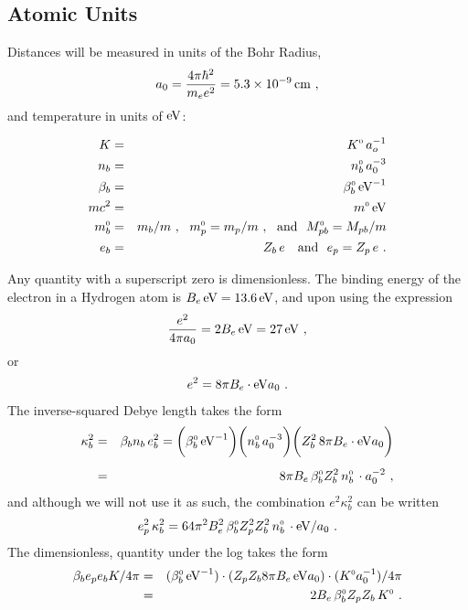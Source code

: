 \documentclass[preprint,12pt,eqsecnum,nofootinbib,amsmath,amssymb]{revtex4}
\newcommand{\smO}{{\rm\scriptscriptstyle 0}}
\begin{document}
\subsection{Atomic Units}

Distances will be measured in units of the Bohr Radius,
\begin{eqnarray}
\label{bohrradiusdef}
  a_0 = \frac{4\pi \hbar^2}{m_e e^2}
  = 5.3 \times 10^{-9}\,{\rm cm} \ ,
\end{eqnarray}
and temperature in units of ${\rm eV}$:
\begin{mathletters}
\label{azeroquantities}  
\begin{eqnarray}
  K &=& K^\smO\, a_o^{-1}
\\
  n_b &=& n_b^\smO\, a_0^{-3} 
\\
  \beta_b &=& \beta_b^\smO\, {\rm eV}^{-1}
\\
  m c^2 &=& m^\smO \, {\rm eV}
\\
  m_b^\smO &=& m_b/m \ , ~~ m_p^\smO = m_p/m \ ,
  ~~{\rm and} ~~ M_{pb}^\smO = M_{pb}/m
\\
  e_b &=& Z_b\, e ~~~{\rm and}~~
  e_p  = Z_p\, e \ .
\end{eqnarray}
\end{mathletters}
Any quantity with a superscript zero is
dimensionless. The binding energy of the 
electron in a Hydrogen atom is $B_e \,
{\rm eV} = 13.6\,{\rm eV}$, and upon 
using the expression
\begin{eqnarray}
\label{eazeroone}
  \frac{e^2}{4\pi a_0} = 2B_e\,{\rm eV} 
  = 27\,{\rm eV} \ ,
\end{eqnarray}
or
\begin{eqnarray}
\label{eazerotwo} 
  e^2 = 8\pi B_e \cdot {\rm eV} a_0 \ .
\end{eqnarray}
The inverse-squared Debye length takes the form
\begin{eqnarray}
\nonumber
  \kappa_b^2 
  &=& \beta_b n_b\, e_b^2
  = 
  \bigg(\beta_b^\smO\,{\rm eV}^{-1}\bigg)
  \bigg(n_b^\smO\, a_0^{-3}\bigg)
  \bigg(Z_b^2\, 8 \pi B_e\cdot {\rm eV} a_0 \bigg)
\\[5pt]
  &=&
  8 \pi B_e \,
  \beta_b^\smO Z_b^2\,n_b^\smO \,\cdot a_0^{-2} \ ,
\end{eqnarray}
and although we will not use it as such, the combination 
$e^2 \kappa_b^2$ can be written
\begin{eqnarray}
  e_p^2\, \kappa_b^2 
  = 
  64 \pi^2 B_e^2 \,
  \beta_b^\smO Z_p^2 Z_b^2\,n_b^\smO \,\cdot {\rm eV}/a_0 \ .
\end{eqnarray}
The dimensionless, quantity under the log takes the form
\begin{eqnarray}
  \beta_b e_p e_b K/4\pi
  &=& (\beta_b^\smO \, {\rm eV}^{-1}) \cdot (Z_p Z_b  
  8\pi B_e \,{\rm eV} a_0 ) \cdot (K^\smO a_0^{-1})/4\pi
\\
  &=&
  2 B_e \,\beta_b^\smO Z_p Z_b \, K^\smO \ .
\end{eqnarray}
\end{document}
